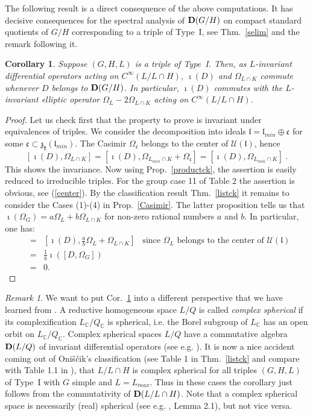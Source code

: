 \documentclass[10]{amsart}
\newtheorem{cor}[thm]{Corollary}
\theoremstyle{remark}
\newtheorem{rem}[thm]{Remark}
\theoremstyle{definition}
\numberwithin{equation}{section}
\newcommand{\C}{\mathbb{C}}           %
\newcommand{\fc}{{\mathfrak c}}
\newcommand{\fk}{{\mathfrak k}}
\newcommand{\fl}{{\mathfrak l}}
\newcommand{\fz}{{\mathfrak z}}
\newcommand{\Cal}{\mathcal}
\begin{document}
{The following result is a direct consequence of the above computations. It has decisive consequences for the spectral analysis of ${\bf D}(G/H)$ on compact standard quotients of  $G/H$
corresponding to a triple of Type~I, see Thm.~\ref{selim} and the remark following it.
%
\begin{cor}\label{commutation}
Suppose $(G,H,L)$ is a triple of Type~I. Then, as  $L$-invariant differential operators acting on $C^\infty(L/L\cap H)$, 
$\imath(D)$ and  $\Omega_{L\cap K}$ commute whenever $D$ belongs to ${\bf D}(G/H)$. In particular, $\imath(D)$ commutes with the $L$-invariant elliptic operator $\Omega_L-2\Omega_{L\cap K}$ acting on $C^\infty(L/L\cap H)$.
\end{cor}
%
\begin{proof}
Let us check first that the property to prove is invariant under equivalences of triples. We consider the decomposition into ideals $\fl=\fl_{min}\oplus \fc$ for some   $\fc\subset 
\fz_{\fk}(\fl_{min})$. The Casimir $\Omega_\fc$ belongs to the center of ${\Cal U}(\fl)$, hence 
$$ [\imath(D),\Omega_{L\cap K}]=[\imath(D),\Omega_{L_{min}\cap K}+\Omega_\fc]=[\imath(D),\Omega_{L_{min}\cap K}]\ .$$
This shows the invariance.
Now using Prop.~\ref{productck}, the assertion is easily reduced to irreducible triples. For the group case 11 of Table 2 the assertion is obvious, see (\ref{center}). By the classification result Thm.~\ref{listck} it remains to consider the Cases (1)-(4) in Prop.~\ref{Casimir}.
The latter proposition tells us that $\imath(\Omega_G)=a\Omega_L+b\Omega_{L\cap K}$ for non-zero rational numbers $a$ and $b$. In particular, one has:
%
\begin{eqnarray*}
[\imath(D),\Omega_{L\cap K}]&=&[\imath(D),\frac{a}{b}\Omega_L+\Omega_{L\cap K}]\;\;\;\text{since $\Omega_L$ belongs to the center of ${\Cal U}(\fl)$}\\
&=&\frac{1}{b}\imath([D,\Omega_G])\\
&=&0.
\end{eqnarray*}
%
\end{proof}
%
\begin{rem}\label{complexsph}
We want to put Cor.~\ref{commutation} into a different perspective that we have learned from \cite{KK19}. A reductive homogeneous space $L/Q$ is called {\em complex spherical} if its
complexification $L_\C/Q_\C$ is spherical, i.e. the Borel subgroup of $L_\C$ has an open orbit on $L_\C/Q_\C$. Complex spherical spaces $L/Q$ have a commutative algebra ${\bf D}(L/Q)$
of invariant differential operators (see e.g. \cite{Vi01}). It is now a nice accident coming out of Oni\v s\v cik's classification (see Table 1 in Thm.~\ref{listck} and compare with Table 1.1  in \cite{KK19}), that $L/L\cap H$ is complex spherical for all triples $(G, H, L)$ of Type~I with $G$ simple
and $L=L_{max}$. Thus in these cases the corollary  just follows from the commutativity of ${\bf D}(L/L\cap H)$. Note that a complex spherical space is necessarily (real) spherical (see e.g.
\cite{KKS}, Lemma 2.1), but not vice versa.
\end{rem}

}
\end{document}
